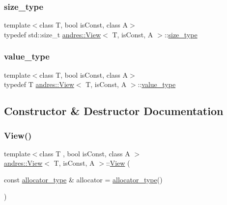 \subsubsection{\texorpdfstring{size\+\_\+type}{size\_type}}
{\footnotesize\ttfamily template$<$class T, bool is\+Const, class A$>$ \\
typedef std\+::size\+\_\+t \hyperlink{classandres_1_1View}{andres\+::\+View}$<$ T, is\+Const, A $>$\+::\hyperlink{classandres_1_1View_aa80ab78f6e3a32ead389d657f6ec7308}{size\+\_\+type}}

\mbox{\label{classandres_1_1View_abe3d48ac2b0d65536e54dbfad0a44929}} 
\subsubsection{\texorpdfstring{value\+\_\+type}{value\_type}}
{\footnotesize\ttfamily template$<$class T, bool is\+Const, class A$>$ \\
typedef T \hyperlink{classandres_1_1View}{andres\+::\+View}$<$ T, is\+Const, A $>$\+::\hyperlink{classandres_1_1View_abe3d48ac2b0d65536e54dbfad0a44929}{value\+\_\+type}}



\subsection{Constructor \& Destructor Documentation}
\mbox{\label{classandres_1_1View_a4368fd5dbfc08a75115341bfa7123a87}} 
\subsubsection{\texorpdfstring{View()}{View()}\hspace{0.1cm}{\footnotesize\ttfamily [1/5]}}
{\footnotesize\ttfamily template$<$class T , bool is\+Const, class A $>$ \\
\hyperlink{classandres_1_1View}{andres\+::\+View}$<$ T, is\+Const, A $>$\+::\hyperlink{classandres_1_1View}{View} (\begin{DoxyParamCaption}\item[{const \hyperlink{classandres_1_1View_a175e5862a7133a937e7901e5894c2e10}{allocator\+\_\+type} \&}]{allocator = {\ttfamily \hyperlink{classandres_1_1View_a175e5862a7133a937e7901e5894c2e10}{allocator\+\_\+type}()} }\end{DoxyParamCaption})\hspace{0.3cm}{\ttfamily [inline]}}


